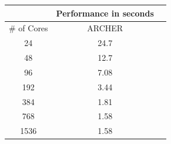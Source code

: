 \begin{center}
\label{table:perf-archer}
\begin{tabular}{|c|c|c|}
\hline
\multicolumn{1}{|l|}{}            & \multicolumn{1}{c|}{Performance in seconds}               \\ \hline
\multicolumn{1}{|l|}{\# of Cores} & \multicolumn{1}{c|}{ARCHER}  \\ \hline
24                                & 24.7                                           \\ \hline
48                                & 12.7                                         \\ \hline
96                               & 7.08                                       \\ \hline
192                               & 3.44                                           \\ \hline
384                               & 1.81                                               \\ \hline
768                              & 1.58                                              \\ \hline
1536                              & 1.58                                              \\ \hline
\end{tabular}
\end{center}


\vspace{1cm}

\noindent%
\begin{minipage}{\linewidth}%
 \label{fig:hemelb-perf-overview}%
\end{minipage}

